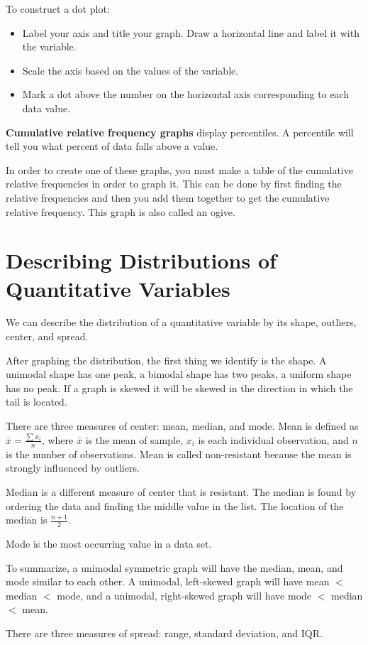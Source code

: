 \documentclass[../stats.tex]{subfiles}
\begin{document}
To construct a dot plot:
\begin{itemize}
    \item Label your axis and title your graph. Draw a horizontal line and label it with the variable.
    \item Scale the axis based on the values of the variable.
    \item Mark a dot above the number on the horizontal axis corresponding to each data value.
\end{itemize}
\textbf{Cumulative relative frequency graphs} display percentiles. A percentile will tell you what percent of data falls above a value.

In order to create one of these graphs, you must make a table of the cumulative relative frequencies in order to graph it. This can be done by first finding the relative frequencies and then you add them together to get the cumulative relative frequency. This graph is also called an ogive.
\section{Describing Distributions of Quantitative Variables}
We can describe the distribution of a quantitative variable by its shape, outliers, center, and spread.

After graphing the distribution, the first thing we identify is the shape. A unimodal shape has one peak, a bimodal shape has two peaks, a uniform shape has no peak. If a graph is skewed it will be skewed in the direction in which the tail is located.

There are three measures of center: mean, median, and mode. Mean is defined as $\bar{x}=\frac{\sum{x_i}}{n}$, where $\bar{x}$ is the mean of sample, $x_i$ is each individual observation, and $n$ is the number of observations. Mean is called non-resistant because the mean is strongly influenced by outliers.

Median is a different measure of center that is resistant. The median is found by ordering the data and finding the middle value in the list. The location of the median is $\frac{n+1}{2}$.

Mode is the most occurring value in a data set.

To summarize, a unimodal symmetric graph will have the median, mean, and mode similar to each other. A unimodal, left-skewed graph will have mean $<$ median $<$ mode, and a unimodal, right-skewed graph will have mode $<$ median $<$ mean.

There are three measures of spread: range, standard deviation, and IQR.
\end{document}
